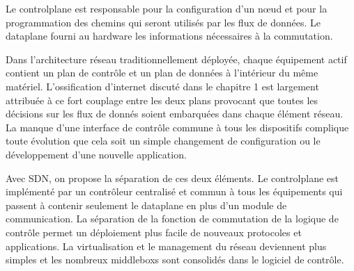 
Le \gls{controlplane} est responsable pour la configuration d'un nœud et pour la programmation des chemins qui seront utilisés par les flux de données. Le \gls{dataplane} fourni au hardware les informations nécessaires à la commutation. \cite{ImplementationChallengesForSDNBackground}



Dans l'architecture réseau traditionnellement déployée, chaque équipement actif contient un plan de contrôle et un plan de données à l'intérieur du même matériel. L'ossification d'internet discuté dans le chapitre 1 est largement attribuée à ce fort couplage entre les deux plans provocant que toutes les décisions sur les flux de donnés soient embarquées dans chaque élément réseau. La manque d'une interface de contrôle commune à tous les dispositifs complique toute évolution que cela soit un simple changement de configuration ou le développement d'une nouvelle application. \cite{SurveySDNArchi}




Avec SDN, on propose la séparation de ces deux éléments. Le \gls{controlplane} est implémenté par un contrôleur centralisé et commun à tous les équipements qui passent à contenir seulement le \gls{dataplane} en plus d'un module de communication.  La séparation de la fonction de commutation de la logique de contrôle permet un déploiement plus facile de nouveaux protocoles et applications. La virtualisation et le management du réseau deviennent plus simples et les nombreux \glspl{middlebox} sont consolidés dans le logiciel de contrôle. \cite{SurveySDNArchi} \cite{SDNNewNormONFExecutiveSummary}

